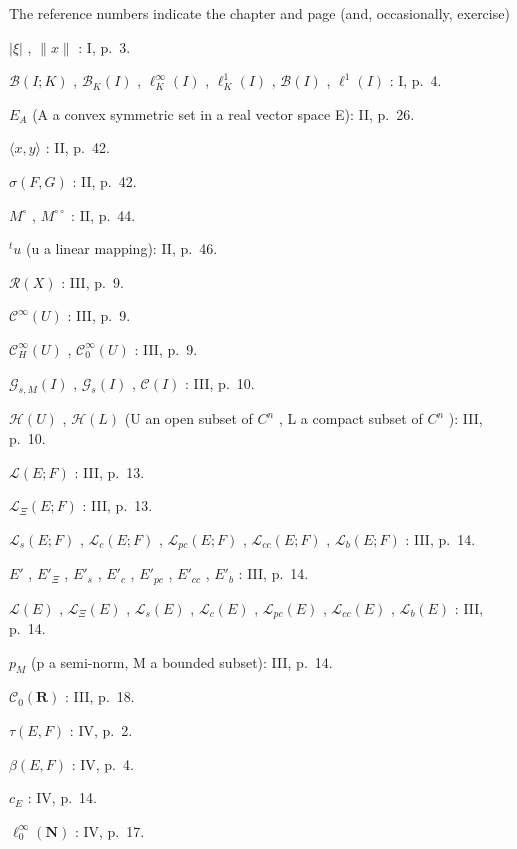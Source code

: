 
The reference numbers indicate the chapter and page (and, occasionally, exercise)

\(|\xi|\) , \(\|x\|\) : I, p.~3.

\(\mathcal{B}(I; K)\) , \(\mathcal{B}_{K}(I)\) , \(\ell_{K}^{\infty}(I)\) , \(\ell_{K}^{1}(I)\) , \(\mathcal{B}(I)\) , \(\ell^{1}(I)\) : I, p.~4.

\(E_{A}\) (A a convex symmetric set in a real vector space E): II, p.~26.

\(\langle x, y \rangle\) : II, p.~42.

\(\sigma(F, G)\) : II, p.~42.

\(M^{\circ}\) , \(M^{\circ\circ}\) : II, p.~44.

\(^{t}u\) (u a linear mapping): II, p.~46.

\(\mathcal{R}(X)\) : III, p.~9.

\(\mathcal{C}^{\infty}(U)\) : III, p.~9.

\(\mathcal{C}_{H}^{\infty}(U)\) , \(\mathcal{C}_{0}^{\infty}(U)\) : III, p.~9.

\(\mathcal{G}_{s,M}(I)\) , \(\mathcal{G}_{s}(I)\) , \(\mathcal{C}(I)\) : III, p.~10.

\(\mathcal{H}(U)\) , \(\mathcal{H}(L)\) (U an open subset of \(C^{n}\) , L a compact subset of \(C^{n}\) ): III, p.~10.

\(\mathcal{L}(E; F)\) : III, p.~13.

\(\mathcal{L}_{\Xi}(E; F)\) : III, p.~13.

\(\mathcal{L}_{s}(E; F)\) , \(\mathcal{L}_{c}(E; F)\) , \(\mathcal{L}_{pc}(E; F)\) , \(\mathcal{L}_{cc}(E; F)\) , \(\mathcal{L}_{b}(E; F)\) : III, p.~14.

\(E'\) , \(E'_{\Xi}\) , \(E'_{s}\) , \(E'_{c}\) , \(E'_{pc}\) , \(E'_{cc}\) , \(E'_{b}\) : III, p.~14.

\(\mathcal{L}(E)\) , \(\mathcal{L}_{\Xi}(E)\) , \(\mathcal{L}_{s}(E)\) , \(\mathcal{L}_{c}(E)\) , \(\mathcal{L}_{pc}(E)\) , \(\mathcal{L}_{cc}(E)\) , \(\mathcal{L}_{b}(E)\) : III, p.~14.

\(p_{M}\) (p a semi-norm, M a bounded subset): III, p.~14.

\(\mathcal{C}_{0}(\mathbf{R})\) : III, p.~18.

\(\tau(E, F)\) : IV, p.~2.

\(\beta(E, F)\) : IV, p.~4.

\(c_{E}\) : IV, p.~14.

\(\ell_{0}^{\infty}(\mathbf{N})\) : IV, p.~17.

